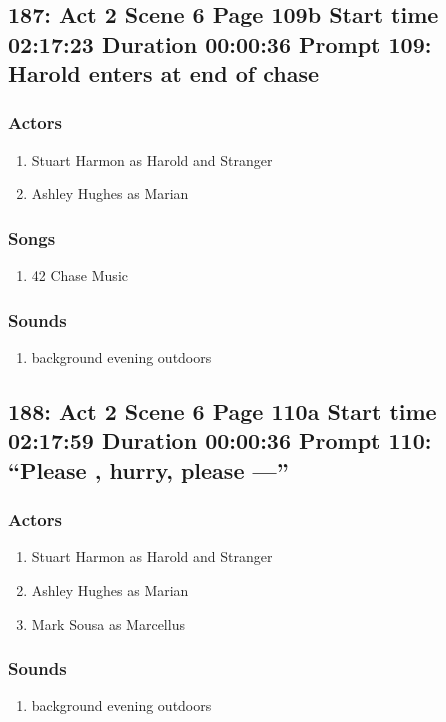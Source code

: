 \subsection{187: Act 2 Scene 6 Page 109b Start time 02:17:23 Duration 00:00:36 Prompt 109: Harold enters at end of chase}

\subsubsection{Actors}
\begin{enumerate}
\item Stuart Harmon as Harold and Stranger
\item Ashley Hughes as Marian
\end{enumerate}

\subsubsection{Songs}
\begin{enumerate}
\item 42 Chase Music
\end{enumerate}\subsubsection{Sounds}
\begin{enumerate}
\item background evening outdoors
\end{enumerate}
\subsection{188: Act 2 Scene 6 Page 110a Start time 02:17:59 Duration 00:00:36 Prompt 110: ``Please , hurry, please ---''}

\subsubsection{Actors}
\begin{enumerate}
\item Stuart Harmon as Harold and Stranger
\item Ashley Hughes as Marian
\item Mark Sousa as Marcellus
\end{enumerate}

\subsubsection{Sounds}
\begin{enumerate}
\item background evening outdoors
\end{enumerate}
